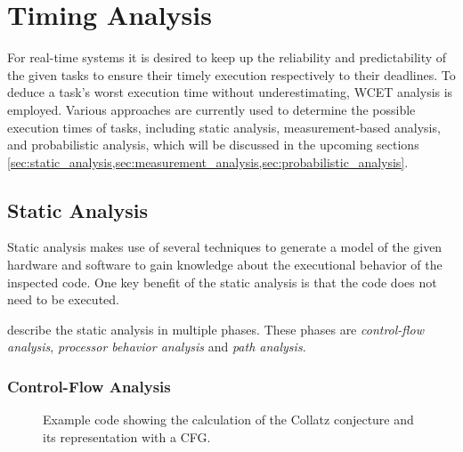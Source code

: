 \section{Timing Analysis}
\label{sec:timing_analysis}
For real-time systems it is desired to keep up the reliability and predictability of the given tasks to ensure their timely execution respectively to their deadlines.
To deduce a task's worst execution time without underestimating, \ac{WCET} analysis is employed.
Various approaches are currently used to determine the possible execution times of tasks, including static analysis, measurement-based analysis, and probabilistic analysis, which will be discussed in the upcoming sections \cref{sec:static_analysis,sec:measurement_analysis,sec:probabilistic_analysis}.

\subsection{Static Analysis}
\label{sec:static_analysis}
Static analysis makes use of several techniques to generate a model of the given hardware and software to gain knowledge about the executional behavior of the inspected code.
One key benefit of the static analysis is that the code does not need to be executed.

\textcite{wilhelmWorstcaseExecutiontimeProblem2008} describe the static analysis in multiple phases.
These phases are \textit{control-flow analysis}, \textit{processor behavior analysis} and \textit{path analysis}.

\subsubsection{Control-Flow Analysis}
\label{sec:cfa}

\begin{figure}[h]
	\begin{subfigure}[c]{0.45\textwidth}
	\end{subfigure}
	\hfill
	\begin{subfigure}[c]{0.45\textwidth}
	\end{subfigure}
	\caption{Example code showing the calculation of the Collatz conjecture and its representation with a \acf{CFG}.}
	\label{fig:collatz_and_cfg}
\end{figure}

